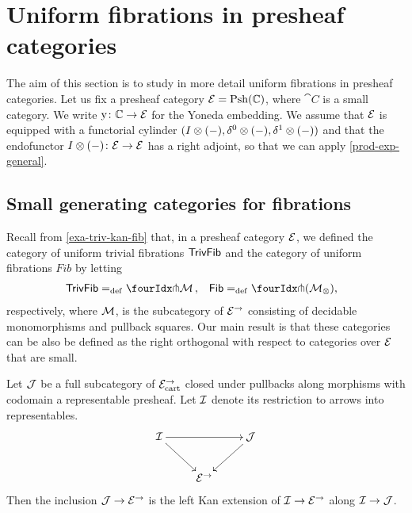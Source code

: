 \documentclass[reqno,10pt,a4paper,oneside,draft]{amsart}
\begin{document}
\section{Uniform fibrations in presheaf categories}
\label{sec:unifpc}

The aim of this section is to study in more detail uniform fibrations in presheaf categories.
Let us fix a presheaf category $\catE = \Psh(\cat{C})$, where $\cat{C}$ is a small category.
We write $\yon \co \catC \to \catE$ for the Yoneda embedding.
We assume that $\catE$ is equipped with a functorial cylinder $( \interval \otimes (-), \lcyl \otimes (-), \rcyl \otimes (-))$ and that the endofunctor $ \interval\otimes (-) \co \catE \to \catE$ has a right adjoint, so that we can apply \cref{prod-exp-general}.

\subsection*{Small generating categories for fibrations}

Recall from \cref{exa-triv-kan-fib} that, in a presheaf category $\catE$, we defined the category of uniform trivial fibrations
$\TrivFib$ and the category of uniform fibrations $Fib$ by letting
\[
\begin{aligned}
  \TrivFib &\defeq \liftr{\cal{M}}
\, ,&
  \Fib &\defeq \liftr{(\cal{M}_\otimes)}
\rlap{,}
\end{aligned}
\]
respectively, where $\cal{M}$, is the subcategory of $\catE^\to$ consisting of decidable monomorphisms and pullback squares.
Our main result is that these categories can be also be defined as the right orthogonal with respect to categories over
$\catE$ that are small.

\begin{lemma} \label{left-kan-extension-of-representables}
Let $\cal{J}$ be a full subcategory of $\catE_{\cart}^\to$ closed under pullbacks along morphisms with codomain a representable presheaf.
Let $\cal{I}$ denote its restriction to arrows into representables.
\[
\xymatrix{
  \cal{I}
  \ar[rr]
  \ar[dr]
&&
  \cal{J}
  \ar[dl]
\\&
  \catE^\to
}
\]
Then the inclusion $\cal{J} \to \catE^\to$ is the left Kan extension of $\cal{I} \to \catE^\to$ along $\cal{I} \to \cal{J}$.
\end{lemma}
\end{document}
